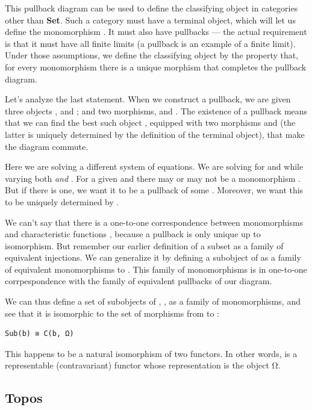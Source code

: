 This pullback diagram can be used to define the classifying object in
categories other than \textbf{Set}. Such a category must have a terminal
object, which will let us define the monomorphism . It must
also have pullbacks --- the actual requirement is that it must have all
finite limits (a pullback is an example of a finite limit). Under those
assumptions, we define the classifying object  by the property
that, for every monomorphism  there is a unique morphism
 that completes the pullback diagram.

Let's analyze the last statement. When we construct a pullback, we are
given three objects ,  and ; and two
morphisms,  and . The existence of a pullback
means that we can find the best such object , equipped with
two morphisms  and  (the latter is uniquely
determined by the definition of the terminal object), that make the
diagram commute.

Here we are solving a different system of equations. We are solving for
 and  while varying both  \emph{and}
. For a given  and  there may or may not
be a monomorphism . But if there is one, we
want it to be a pullback of some . Moreover, we want this
 to be uniquely determined by .

We can't say that there is a one-to-one correspondence between
monomorphisms  and characteristic functions ,
because a pullback is only unique up to isomorphism. But remember our
earlier definition of a subset as a family of equivalent injections. We
can generalize it by defining a subobject of  as a family of
equivalent monomorphisms to . This family of monomorphisms is
in one-to-one corrpespondence with the family of equivalent pullbacks of
our diagram.

We can thus define a set of subobjects of , ,
as a family of monomorphisms, and see that it is isomorphic to the set
of morphisms from  to :

\begin{verbatim}
Sub(b) ≅ C(b, Ω)
\end{verbatim}

This happens to be a natural isomorphism of two functors. In other
words,  is a representable (contravariant) functor whose
representation is the object Ω.

\subsection{Topos}\label{topos}

